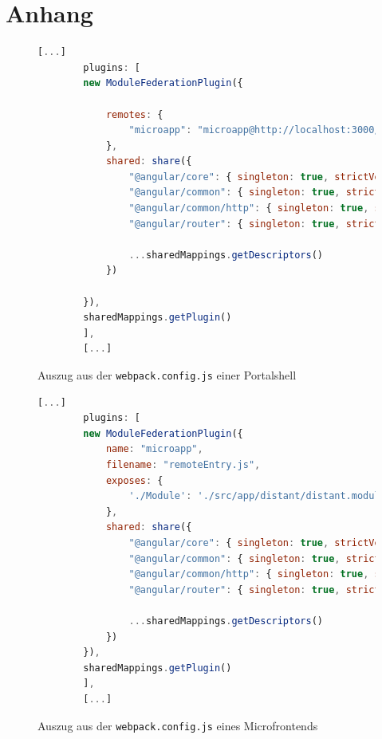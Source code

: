 \section*{Anhang}

\anhangsverzeichnis

\label{app:Listing}

\begin{figure}[bht]
	\begin{lstlisting}[caption=Exemplarische Konfiguration Module Federation Portalshell, label=lst:ModuleFederationWebpackShell, language=Javascript]
		[...]
		plugins: [
		new ModuleFederationPlugin({
			
			remotes: {
				"microapp": "microapp@http://localhost:3000/remoteEntry.js",
			},
			shared: share({
				"@angular/core": { singleton: true, strictVersion: true, requiredVersion: 'auto' }, 
				"@angular/common": { singleton: true, strictVersion: true, requiredVersion: 'auto' }, 
				"@angular/common/http": { singleton: true, strictVersion: true, requiredVersion: 'auto' }, 
				"@angular/router": { singleton: true, strictVersion: true, requiredVersion: 'auto' },
				
				...sharedMappings.getDescriptors()
			})
			
		}),
		sharedMappings.getPlugin()
		],
		[...]
	\end{lstlisting}
	\footnoterule{}
	\footnotesize{Auszug aus der \texttt{webpack.config.js} einer Portalshell}
\end{figure}

\newpage
\begin{figure}[bht]
	\begin{lstlisting}[caption=Exemplarische Konfiguration Module Federation Microfrontend, label=lst:ModuleFederationWebpackRemote, language=Javascript]
		[...]
		plugins: [
		new ModuleFederationPlugin({      
			name: "microapp",
			filename: "remoteEntry.js",  
			exposes: {
				'./Module': './src/app/distant/distant.module.ts',
			},
			shared: share({
				"@angular/core": { singleton: true, strictVersion: true, requiredVersion: 'auto' }, 
				"@angular/common": { singleton: true, strictVersion: true, requiredVersion: 'auto' }, 
				"@angular/common/http": { singleton: true, strictVersion: true, requiredVersion: 'auto' }, 
				"@angular/router": { singleton: true, strictVersion: true, requiredVersion: 'auto' },
				
				...sharedMappings.getDescriptors()
			})        
		}),
		sharedMappings.getPlugin()
		],
		[...]
	\end{lstlisting}
	\footnoterule{}
	\footnotesize{Auszug aus der \texttt{webpack.config.js} eines Microfrontends}
\end{figure}

